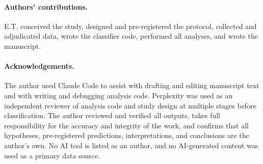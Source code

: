 \documentclass[11pt]{article}
\begin{document}
\paragraph{Authors' contributions.}
E.T. conceived the study, designed and pre-registered the protocol, collected and adjudicated data, wrote the classifier code, performed all analyses, and wrote the manuscript.

\paragraph{Acknowledgements.}
The author used Claude Code \cite{claudecode} to assist with drafting and editing manuscript text and with writing and debugging analysis code. Perplexity \cite{perplexityai} was used as an independent reviewer of analysis code and study design at multiple stages before classification. The author reviewed and verified all outputs, takes full responsibility for the accuracy and integrity of the work, and confirms that all hypotheses, pre-registered predictions, interpretations, and conclusions are the author's own. No AI tool is listed as an author, and no AI-generated content was used as a primary data source.
\end{document}

